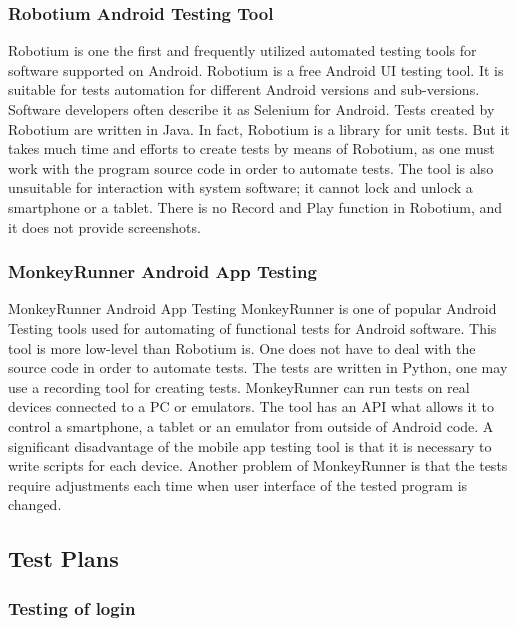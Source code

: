 \subsubsection{Robotium Android Testing Tool}
Robotium is one the first and frequently utilized automated testing tools for software supported on Android. Robotium is a free Android UI testing tool. It is suitable for tests automation for different Android versions and sub-versions. Software developers often describe it as Selenium for Android. Tests created by Robotium are written in Java. In fact, Robotium is a library for unit tests.
But it takes much time and efforts to create tests by means of Robotium, as one must work with the program source code in order to automate tests. The tool is also unsuitable for interaction with system software; it cannot lock and unlock a smartphone or a tablet. There is no Record and Play function in Robotium, and it does not provide screenshots.
\subsubsection{MonkeyRunner Android App Testing}
MonkeyRunner Android App Testing
MonkeyRunner is one of popular Android Testing tools used for automating of functional tests for Android software. This tool is more low-level than Robotium is. One does not have to deal with the source code in order to automate tests. The tests are written in Python, one may use a recording tool for creating tests.
MonkeyRunner can run tests on real devices connected to a PC or emulators. The tool has an API what allows it to control a smartphone, a tablet or an emulator from outside of Android code. A significant disadvantage of the mobile app testing tool is that it is necessary to write scripts for each device. Another problem of MonkeyRunner is that the tests require adjustments each time when user interface of the tested program is changed.

\subsection{Test Plans}

\subsubsection{Testing of login}

